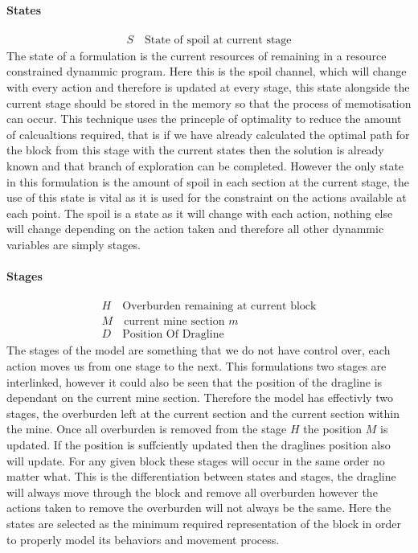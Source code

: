 \paragraph*{States}
\begin{align}
\label{Stte}
S \quad \text{State of spoil at current stage}
\end{align}
The state of a formulation is the current resources of remaining in a resource constrained dynammic program. Here this is the spoil channel, which will change with every action and therefore is updated at every stage, this state alongside the current stage should be stored in the memory so that the process of memotisation can occur. This technique uses the princeple of optimality to reduce the amount of calcualtions required, that is if we have already calculated the optimal path for the block from this stage with the current states then the solution is already known and that branch of exploration can be completed. However the only state in this formulation is the amount of spoil in each section at the current stage, the use of this state is vital as it is used for the constraint on the actions available at each point. The spoil is a state as it will change with each action, nothing else will change depending on the action taken and therefore all other dynammic variables are simply stages. 
\paragraph*{Stages}
\begin{align}
\label{DP:Stage0}
H \quad \text{Overburden remaining at current block}\\
\label{DP:Stage1}
M \quad \text{current mine section }m \\ 
\label{DP:stage2}
D \quad \text{Position Of Dragline}
\end{align}
The stages of the model are something that we do not have control over, each action moves us from one stage to the next. This formulations two stages are interlinked, however it could also be seen that the position of the dragline is dependant on the current mine section. Therefore the model has effectivly two stages, the overburden left at the current section and the current section within the mine. Once all overburden is removed from the stage $H$ the position $M$ is updated. If the position is suffciently updated then the draglines position also will update. For any given block these stages will occur in the same order no matter what. This is the differentiation between states and stages, the dragline will always move through the block and remove all overburden however the actions taken to remove the overburden will not always be the same. Here the states are selected as the minimum required representation of the block in order to properly model its behaviors and movement process. 	
